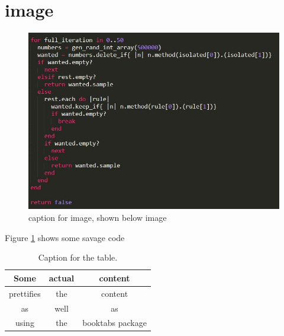 \documentclass{article}
\begin{document}
\section{image}
\begin{figure}
\includegraphics[width=\linewidth]{screenshots/code-gen-int-pre_divisible_keep_if}
\caption{caption for image, shown below image}
\label{fig:code1}
\end{figure}
Figure \ref{fig:code1} shows some savage code

	
\begin{table}[h!]
\centering
\caption{Caption for the table.}
\label{tab:table1}
\begin{tabular}{ccc}
\toprule
Some & actual & content\\
\midrule
prettifies & the & content\\
as & well & as\\
using & the & booktabs package\\
\bottomrule
\end{tabular}
\end{table}



\end{document}
